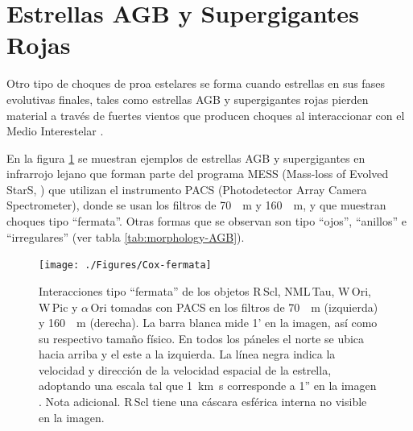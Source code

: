 \section{Estrellas AGB y Supergigantes Rojas}

Otro tipo de choques de proa estelares se forma cuando estrellas en sus fases evolutivas finales, tales como estrellas AGB y supergigantes rojas pierden material a través de fuertes vientos que producen choques al interaccionar con el Medio Interestelar \citep{Cox:2012}.

En la figura  \ref{fig:fermata} se muestran ejemplos de estrellas AGB y supergigantes en infrarrojo lejano que forman parte del programa MESS (Mass-loss of Evolved StarS, \citet{Groenewegen:2011}) que utilizan el instrumento PACS (Photodetector Array Camera Spectrometer), donde se usan los filtros de \SI{70}{\mu.m} y \SI{160}{\mu.m}, y que muestran choques tipo ``fermata''. Otras formas que se observan son tipo ``ojos'', ``anillos'' e ``irregulares'' (ver tabla \ref{tab:morphology-AGB}).

\begin{figure}
  \centering
  \texttt{[image: ./Figures/Cox-fermata]}
  \caption{Interacciones tipo ``fermata'' de los objetos R\,Scl, NML\,Tau, W\,Ori, W\,Pic y $\alpha$\,Ori tomadas con PACS en los filtros de \SI{70}{\mu.m} (izquierda) y \SI{160}{\mu.m} (derecha). La barra blanca mide 1' en la imagen, así como su respectivo tamaño físico. En todos los páneles el norte se ubica hacia arriba y el este a la izquierda. La línea negra indica la velocidad y dirección de la velocidad espacial de la estrella, adoptando una escala tal que \SI{1}{km.s} corresponde a 1'' en la imagen \citep{Cox:2012}. Nota adicional. R\,Scl tiene una cáscara esférica interna no visible en la imagen.}
  \label{fig:fermata}
\end{figure}

